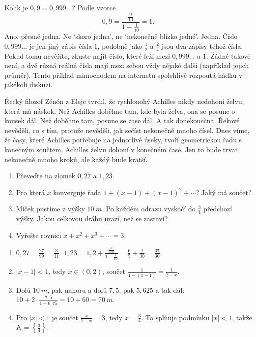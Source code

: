 \begin{example}\label{ex:0999}
  Kolik je $0{,}\overline{9} = 0{,}999\ldots$? Podle vzorce
  \begin{equation*}
    0{,}\overline{9} = \frac{\frac{9}{10}}{1 - \frac{1}{10}} = 1.
  \end{equation*}
  Ano, přesně jedna. Ne `skoro jedna', ne `nekonečně blízko jedné'. Jedna. Číslo $0{,}999\ldots$ je jen jiný zápis čísla $1$, podobně jako $\frac{1}{2}$ a $\frac{2}{4}$ jsou dva zápisy téhož čísla. Pokud tomu nevěříte, zkuste najít číslo, které leží mezi $0{,}999\ldots$ a $1$. Žádné takové není, a dvě různá reálná čísla mají mezi sebou vždy nějaké další (například jejich průměr). Tento příklad mimochodem na internetu spolehlivě rozpoutá hádku v jakékoli diskuzi.
\end{example}

\begin{note}
  Řecký filozof Zénón z Eleje tvrdil, že rychlonohý Achilles nikdy nedohoní želvu, která má náskok. Než Achilles doběhne tam, kde byla želva, ona se posune o kousek dál. Než doběhne tam, posune se zase dál. A tak donekonečna. Řekové nevěděli, co s tím, protože nevěděli, jak sečíst nekonečně mnoho čísel. Dnes víme, že časy, které Achilles potřebuje na jednotlivé úseky, tvoří geometrickou řadu s konečným součtem. Achilles želvu dohoní v konečném čase. Jen to bude trvat nekonečně mnoho kroků, ale každý bude kratší.
\end{note}

\begin{problem}
  \begin{enumerate}[label=(\alph*)]
    \item Převeďte na zlomek $0{,}\overline{27}$ a $1{,}2\overline{3}$.
    \item Pro která $x$ konverguje řada $1 + (x - 1) + {(x - 1)}^2 + \cdots$? Jaký má součet?
    \item Míček pustíme z výšky $10\ \si{m}$. Po každém odrazu vyskočí do $\frac{3}{4}$ předchozí výšky. Jakou celkovou dráhu urazí, než se zastaví?
    \item Vyřešte rovnici $x + x^2 + x^3 + \cdots = 3$.
  \end{enumerate}
\end{problem}

\begin{solution}
  \begin{enumerate}[label=(\alph*)]
    \item $0{,}\overline{27} = \frac{27}{99} = \frac{3}{11}$. $1{,}2\overline{3} = 1{,}2 + \frac{\frac{3}{100}}{1 - \frac{1}{10}} = \frac{6}{5} + \frac{1}{30} = \frac{37}{30}$.
    \item $|x - 1| < 1$, tedy $x\in(0, 2)$, součet $\frac{1}{1 - (x - 1)} = \frac{1}{2 - x}$.
    \item Dolů $10\ \si{m}$, pak nahoru a dolů $7{,}5$, pak $5{,}625$ a tak dál: $10 + 2\cdot\frac{7{,}5}{1 - 0{,}75} = 10 + 60 = 70\ \si{m}$.
    \item Pro $|x| < 1$ je součet $\frac{x}{1 - x} = 3$, tedy $x = \frac{3}{4}$. To splňuje podmínku $|x| < 1$, takže $K = \left\{\frac{3}{4}\right\}$.
  \end{enumerate}
\end{solution}

